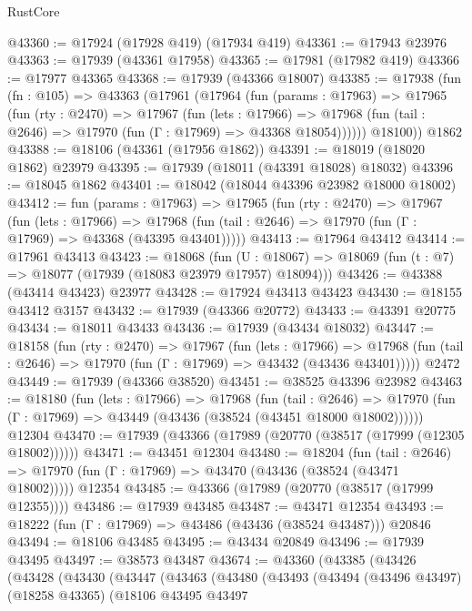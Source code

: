 \begin{lexlean}{RustCore}
\begin{coremodule}
@43360 := @17924 (@17928 @419) (@17934 @419)
@43361 := @17943 @23976
@43363 := @17939 (@43361 @17958)
@43365 := @17981 (@17982 @419)
@43366 := @17977 @43365
@43368 := @17939 (@43366 @18007)
@43385 := @17938
    (fun (fn : @105) =>
    @43363
      (@17961
        (@17964
          (fun (params : @17963) =>
          @17965
            (fun (rty : @2470) =>
            @17967
              (fun (lets : @17966) =>
              @17968 (fun (tail : @2646) => @17970 (fun (Γ : @17969) => @43368 @18054))))))
        @18100))
    @1862
@43388 := @18106 (@43361 (@17956 @1862))
@43391 := @18019 (@18020 @1862) @23979
@43395 := @17939 (@18011 (@43391 @18028) @18032)
@43396 := @18045 @1862
@43401 := @18042 (@18044 @43396 @23982 @18000 @18002)
@43412 := fun (params : @17963) =>
  @17965
    (fun (rty : @2470) =>
    @17967
      (fun (lets : @17966) =>
      @17968 (fun (tail : @2646) => @17970 (fun (Γ : @17969) => @43368 (@43395 @43401)))))
@43413 := @17964 @43412
@43414 := @17961 @43413
@43423 := @18068
    (fun (U : @18067) => @18069 (fun (t : @7) => @18077 (@17939 (@18083 @23979 @17957) @18094)))
@43426 := @43388 (@43414 @43423) @23977
@43428 := @17924 @43413 @43423
@43430 := @18155 @43412 @3157
@43432 := @17939 (@43366 @20772)
@43433 := @43391 @20775
@43434 := @18011 @43433
@43436 := @17939 (@43434 @18032)
@43447 := @18158
    (fun (rty : @2470) =>
    @17967
      (fun (lets : @17966) =>
      @17968 (fun (tail : @2646) => @17970 (fun (Γ : @17969) => @43432 (@43436 @43401)))))
    @2472
@43449 := @17939 (@43366 @38520)
@43451 := @38525 @43396 @23982
@43463 := @18180
    (fun (lets : @17966) =>
    @17968
      (fun (tail : @2646) =>
      @17970 (fun (Γ : @17969) => @43449 (@43436 (@38524 (@43451 @18000 @18002))))))
    @12304
@43470 := @17939 (@43366 (@17989 (@20770 (@38517 (@17999 (@12305 @18002))))))
@43471 := @43451 @12304
@43480 := @18204
    (fun (tail : @2646) => @17970 (fun (Γ : @17969) => @43470 (@43436 (@38524 (@43471 @18002)))))
    @12354
@43485 := @43366 (@17989 (@20770 (@38517 (@17999 @12355))))
@43486 := @17939 @43485
@43487 := @43471 @12354
@43493 := @18222 (fun (Γ : @17969) => @43486 (@43436 (@38524 @43487))) @20846
@43494 := @18106 @43485
@43495 := @43434 @20849
@43496 := @17939 @43495
@43497 := @38573 @43487
@43674 := @43360
    (@43385
      (@43426
        (@43428
          (@43430
            (@43447
              (@43463
                (@43480
                  (@43493
                    (@43494
                      (@43496 @43497)
                      (@18258 @43365)
                      (@18106
                        @43495
                        @43497

\end{coremodule}
\end{lexlean}
